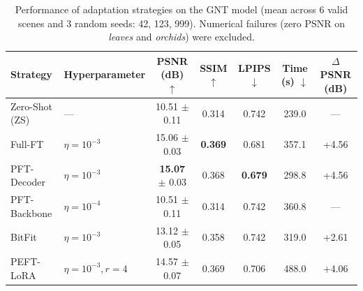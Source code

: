 \begin{table}[H]
\centering
\caption{Performance of adaptation strategies on the GNT model (mean across 6 valid scenes and 3 random seeds: 42, 123, 999). Numerical failures (zero PSNR on \textit{leaves} and \textit{orchids}) were excluded.}
\label{tab:gnt_strategies_summary}
\scriptsize
\begin{tabular*}{\linewidth}{@{\extracolsep{\fill}}llccccc@{\extracolsep{0pt}}}
\toprule
Strategy & Hyperparameter & PSNR (dB) $\uparrow$ & SSIM $\uparrow$ & LPIPS $\downarrow$ & Time (s) $\downarrow$ & $\Delta$PSNR (dB) \\
\midrule
Zero-Shot (ZS)     & ---                    & 10.51 $\pm$ 0.11           & 0.314          & 0.742          & 239.0    & --- \\
Full-FT            & $\eta=10^{-3}$         & 15.06 $\pm$ 0.03           & \textbf{0.369} & 0.681          & 357.1    & +4.56 \\
PFT-Decoder        & $\eta=10^{-3}$         & \textbf{15.07} $\pm$ 0.03  & 0.368          & \textbf{0.679} & 298.8    & +4.56 \\
PFT-Backbone       & $\eta=10^{-4}$         & 10.51 $\pm$ 0.11           & 0.314          & 0.742          & 360.8    & --- \\
BitFit             & $\eta=10^{-3}$         & 13.12 $\pm$ 0.05           & 0.358          & 0.742          & 319.0    & +2.61 \\
PEFT-LoRA          & $\eta=10^{-3}, r=4$    & 14.57 $\pm$ 0.07           & 0.369          & 0.706          & 488.0    & +4.06 \\
\bottomrule
\end{tabular*}
\end{table}
